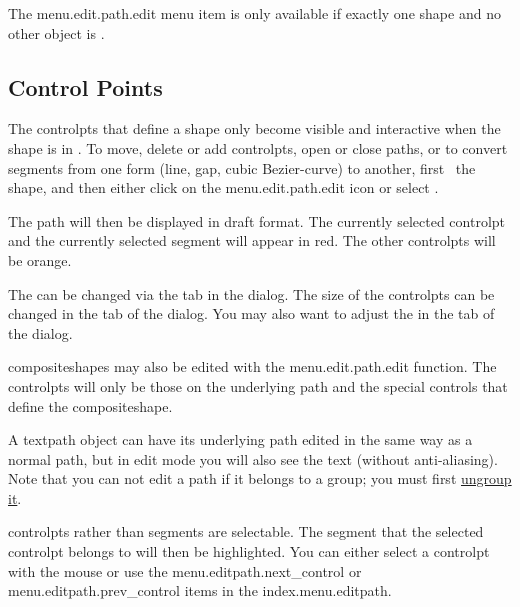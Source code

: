 The \gls{menu.edit.path.edit} menu item
is only available if exactly one \gls{shape} and no other
\gls{object} is \selected.

\subsection{Control Points}\label{sec:editcontrolpt}

The \glspl{controlpt} that define a \gls{shape} only become visible
and interactive when the shape is in \editpathmode.
To move, delete or add \glspl{controlpt}, open or close
\glspl{path}, or to convert segments from one form (line, \gls{gap}, cubic
\gls{Bezier-curve}) to another, first \select\ the \gls*{shape}, and
then either click on the \gls{menu.edit.path.edit} icon or select
.

The \gls*{path} will then be displayed in draft format.  The
currently selected \gls*{controlpt} and the currently selected
segment will appear in red. The other \glspl*{controlpt} will be
orange.

\begin{information}
The  can be changed via the 
tab in the  dialog. The size of the
\glspl{controlpt} can be changed in the  tab
of the  dialog. You may also want to adjust the
 in the  tab of the
 dialog.
\end{information}

\Glspl{compositeshape} may also be edited with 
the \gls{menu.edit.path.edit} function. The
\glspl{controlpt} will only be those on the underlying path and 
the special controls that define the \gls{compositeshape}.

A \gls{textpath} object can have its underlying path edited in the
same way as a normal \gls{path}, but in edit mode you will also see
the text (without \gls{anti-aliasing}).  Note that you can not edit
a \gls{path} if it belongs to a \gls{group}; you must first
\hyperref[sec:grouping]{ungroup it}.

\begin{information}
\Glspl{controlpt} rather than segments are selectable. The segment
that the selected \gls{controlpt} belongs to will then be
highlighted. You can either select a \gls{controlpt} with the mouse
or use the \gls{menu.editpath.next_control} or \gls{menu.editpath.prev_control}
items in the \gls{index.menu.editpath}.
\end{information}

